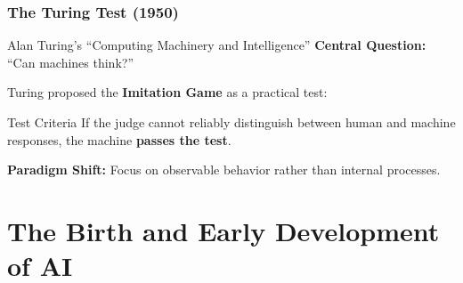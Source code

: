 \documentclass{beamer}
\begin{document}
\begin{frame}
    \frametitle{The Turing Test (1950)}
    \begin{block}{Alan Turing's ``Computing Machinery and Intelligence''}
        \textbf{Central Question:} ``Can machines think?''
        
        Turing proposed the \textbf{Imitation Game} as a practical test:
    \end{block}
    
    \begin{center}
    \end{center}
    
    \begin{alertblock}{Test Criteria}
        If the judge cannot reliably distinguish between human and machine responses, the machine \textbf{passes the test}.
    \end{alertblock}
    
    \textcolor{MyBlue}{\textbf{Paradigm Shift:}} Focus on observable behavior rather than internal processes.
\end{frame}

\section{The Birth and Early Development of AI}
\end{document}
